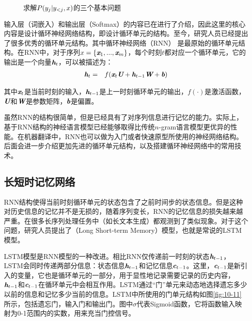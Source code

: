 \vspace{-2em}
\begin{figure}[htp]
\centering
 
\caption{求解${P} (y_j | {{y}}_{<j},{{x}})$的三个基本问题}
\label{fig:10-10}
\end{figure}

\parinterval 输入层（词嵌入）和输出层（Softmax）的内容已在{\chapternine}进行了介绍，因此这里的核心内容是设计循环神经网络结构，即设计循环单元的结构。至今，研究人员已经提出了很多优秀的循环单元结构。其中循环神经网络（RNN）
是最原始的循环单元结构。在RNN中，对于序列${{x}}=\{ \textbf{\em x}_1,...,\textbf{\em x}_m \}$，每个时刻$t$都对应一个循环单元，它的输出是一个向量$\textbf{\em h}_t$，可以被描述为：
\begin{eqnarray}
\textbf{\em h}_t &=& f(\textbf{\em x}_t \textbf{\em U}+\textbf{\em h}_{t-1} \textbf{\em W}+\textbf{\em b})
\label{eq:10-5}
\end{eqnarray}

\noindent 其中$\textbf{\em x}_t$是当前时刻的输入，$\textbf{\em h}_{t-1}$是上一时刻循环单元的输出，$f(\cdot)$是激活函数，$\textbf{\em U}$和$\textbf{\em W}$是参数矩阵，$\textbf{\em b}$是偏置。

\parinterval 虽然RNN的结构很简单，但是已经具有了对序列信息进行记忆的能力。实际上，基于RNN结构的神经语言模型已经能够取得比传统$n$-gram语言模型更优异的性能。在机器翻译中，RNN也可以做为入门或者快速原型所使用的神经网络结构。后面会进一步介绍更加先进的循环单元结构，以及搭建循环神经网络中的常用技术。

\vspace{-1em}
\subsection{长短时记忆网络}
\label{sec:lstm-cell}

\parinterval RNN结构使得当前时刻循环单元的状态包含了之前时间步的状态信息。但是这种对历史信息的记忆并不是无损的，随着序列变长，RNN的记忆信息的损失越来越严重。在很多长序列处理任务中（如长文本生成）都观测到了类似现象。对于这个问题，研究人员提出了{\small{}}（Long Short-term Memory）模型，也就是常说的LSTM模型。

\parinterval LSTM模型是RNN模型的一种改进。相比RNN仅传递前一时刻的状态$\textbf{\em h}_{t-1}$，LSTM会同时传递两部分信息：状态信息$\textbf{\em h}_{t-1}$和记忆信息$\textbf{\em c}_{t-1}$。这里，$\textbf{\em c}_{t-1}$是新引入的变量，它也是循环单元的一部分，用于显性地记录需要记录的历史内容，$\textbf{\em h}_{t-1}$和$\textbf{\em c}_{t-1}$在循环单元中会相互作用。LSTM通过“门”单元来动态地选择遗忘多少以前的信息和记忆多少当前的信息。LSTM中所使用的门单元结构如图\ref{fig:10-11}所示，包括遗忘门，输入门和输出门。图中$\sigma$代表Sigmoid函数，它将函数输入映射为0-1范围内的实数，用来充当门控信号。

